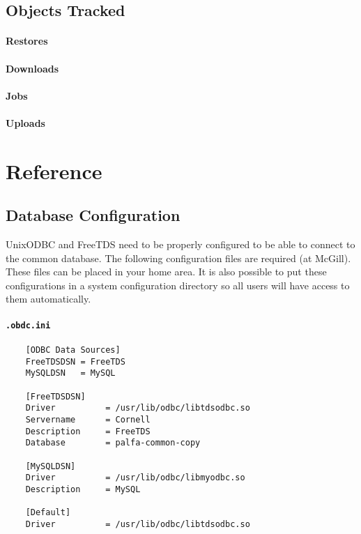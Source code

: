 \documentclass[12pt]{article}
\begin{document}
\subsection{Objects Tracked}
\paragraph{Restores}

\paragraph{Downloads}

\paragraph{Jobs}

\paragraph{Uploads}


\section{Reference}
\subsection{Database Configuration}
\label{sec:dbconf}
UnixODBC and FreeTDS need to be properly configured to be able to connect to the common database. The following configuration files are required (at McGill). These files can be placed in your home area. It is also possible to put these configurations in a system configuration directory so all users will have access to them automatically.

\paragraph{\texttt{.obdc.ini}}
\begin{verbatim}
    [ODBC Data Sources]
    FreeTDSDSN = FreeTDS
    MySQLDSN   = MySQL

    [FreeTDSDSN]
    Driver          = /usr/lib/odbc/libtdsodbc.so
    Servername      = Cornell
    Description     = FreeTDS
    Database        = palfa-common-copy

    [MySQLDSN]
    Driver          = /usr/lib/odbc/libmyodbc.so
    Description     = MySQL

    [Default]
    Driver          = /usr/lib/odbc/libtdsodbc.so
\end{verbatim}
\end{document}
